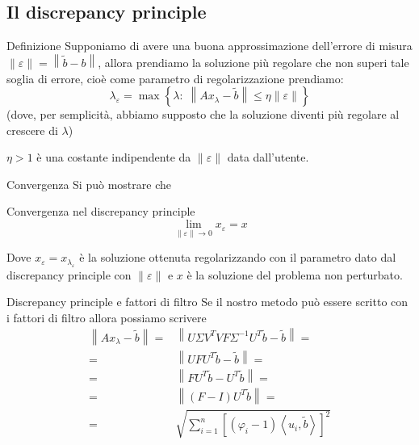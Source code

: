 \documentclass{beamer}
\theoremstyle{plain}
\theoremstyle{definition}
\theoremstyle{remark}
\newcommand{\set}[1]{\left\{#1\right\}}
\newcommand{\pa}[1]{\left(#1\right)}
\newcommand{\ang}[1]{\left<#1\right>}
\newcommand{\bra}[1]{\left[#1\right]}
\newcommand{\norm}[1]{\left\|#1\right\|}
\begin{document}
\subsection{Il discrepancy principle}

\begin{frame}{Definizione}
  Supponiamo di avere una buona approssimazione dell'errore di misura
  $\norm{\varepsilon} = \norm{\tilde b - b}$, allora prendiamo la
  soluzione più regolare che non superi tale soglia di errore, cioè
  come parametro di regolarizzazione prendiamo:
  \[ \lambda _\varepsilon = \max \set { \lambda :\; \norm{ Ax_\lambda -
      \tilde b} \le \eta \norm{\varepsilon}} \]
  (dove, per semplicità, abbiamo supposto che la soluzione diventi più
  regolare al crescere di $\lambda$)

  $\eta >1$ è una costante indipendente da $\norm{\varepsilon}$ data
  dall'utente.
\end{frame}

\begin{frame}{Convergenza}
  Si può mostrare che
  \begin{block}{Convergenza nel discrepancy principle}
    \[ \lim \limits _{\norm{\varepsilon} \to 0} x _\varepsilon = x \]
  \end{block}
  Dove $x_\varepsilon = x_{\lambda _ \varepsilon}$ è la soluzione
  ottenuta regolarizzando con il parametro dato dal discrepancy
  principle con $\norm{\varepsilon}$ e $x$ è la soluzione del problema
  non perturbato.
\end{frame}

\begin{frame}{Discrepancy principle e fattori di filtro}
  Se il nostro metodo può essere scritto con i fattori di filtro
  allora possiamo scrivere
  \begin{align*}
    \norm{ Ax_\lambda - \tilde b } =& \norm{ U \Sigma V^T V F \Sigma
      ^{-1} U^T \tilde b - \tilde b} =\\
    =& \norm { U F U^T \tilde b - \tilde b} =\\
    = & \norm{ F U^T \tilde b - U^T \tilde b } =\\
    =& \norm{ \pa{F-I} U^T \tilde b} =\\
    =& \sqrt{\sum _{i=1} ^n \bra{ \pa{ \varphi _i -1} \ang{ u_i, \tilde b} } ^2}
  \end{align*}
\end{frame}
\end{document}
